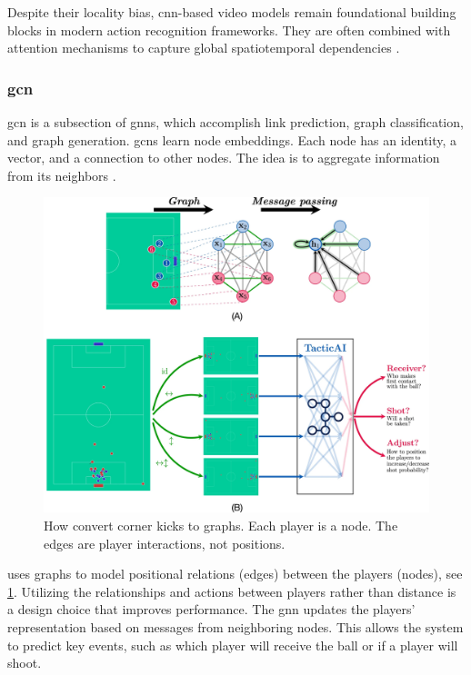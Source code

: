 Despite their locality bias, \acrshort{cnn}-based video models remain foundational building blocks in modern action recognition frameworks. They are often combined with attention mechanisms to capture global spatiotemporal dependencies \cite{fu_look_2017}.

\subsubsection{\acrfull{gcn}}

\acrfull{gcn} is a subsection of \acrfull{gnn}s, which accomplish link prediction, graph classification, and graph generation. \acrshort{gcn}s learn node embeddings. Each node has an identity, a vector, and a connection to other nodes. The idea is to aggregate information from its neighbors \cite{kipf_gcn_2017}.

\begin{figure}
    \centering
    \includegraphics[width=1\linewidth]{figures/tacticai_graph.png}
    \caption{How \textcite{wang_tactic_ai_2024} convert corner kicks to graphs. Each player is a node. The edges are player interactions, not positions.}
    \label{fig:graph_corner}
\end{figure}

\textcite{wang_tactic_ai_2024} uses graphs to model positional relations (edges) between the players (nodes), see \cref{fig:graph_corner}. Utilizing the relationships and actions between players rather than distance is a design choice that improves performance. The \acrshort{gnn} updates the players' representation based on messages from neighboring nodes. This allows the system to predict key events, such as which player will receive the ball or if a player will shoot. 

